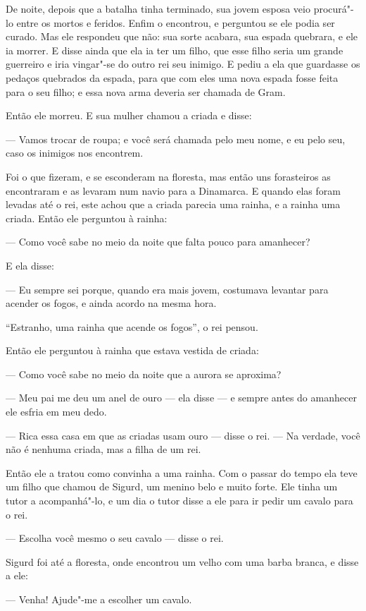 De noite,
depois que a batalha tinha terminado, sua jovem esposa veio
procurá"-lo entre os mortos e feridos. Enfim o encontrou, e perguntou
se ele podia ser curado. Mas ele respondeu que não: sua sorte
acabara, sua espada quebrara, e ele ia morrer. E disse ainda que ela
ia ter um filho, que esse filho seria um grande guerreiro e iria
vingar"-se do outro rei seu inimigo. E pediu a ela que guardasse os
pedaços quebrados da espada, para que com eles uma nova espada fosse
feita para o seu filho; e essa nova arma deveria ser chamada de Gram.


Então ele morreu. E sua mulher chamou a criada e disse:

--- Vamos trocar de roupa; e você será chamada pelo meu nome, e eu pelo
seu, caso os inimigos nos encontrem.

Foi o que fizeram, e se esconderam na floresta, mas então uns
forasteiros as encontraram e as levaram num navio para a Dinamarca. E
quando elas foram levadas até o rei, este achou que a criada parecia
uma rainha, e a rainha uma criada. Então ele perguntou à rainha:

--- Como você sabe no meio da noite que falta pouco para amanhecer? 

E ela disse:

--- Eu sempre sei porque, quando era mais jovem, costumava levantar para
acender os fogos, e ainda acordo na mesma hora.

“Estranho, uma rainha que acende os fogos”, o rei pensou.

Então ele perguntou à rainha que estava vestida de criada:

--- Como você sabe no meio da noite que a aurora se aproxima? 

--- Meu pai me deu um anel de ouro --- ela disse --- e sempre antes do
amanhecer ele esfria em meu dedo.

--- Rica essa casa em que as criadas usam ouro --- disse o rei. --- Na
verdade, você não é nenhuma criada, mas a filha de um rei. 

Então ele a tratou como convinha a uma rainha. Com o passar do tempo
ela teve um filho que chamou de Sigurd, um menino belo e muito forte.
Ele tinha um tutor a acompanhá"-lo, e um dia o tutor disse a ele para
ir pedir um cavalo para o rei. 

--- Escolha você mesmo o seu cavalo --- disse o rei.

Sigurd foi até a
floresta, onde encontrou um velho com uma barba branca, e disse a
ele:

--- Venha! Ajude"-me a escolher um cavalo.

